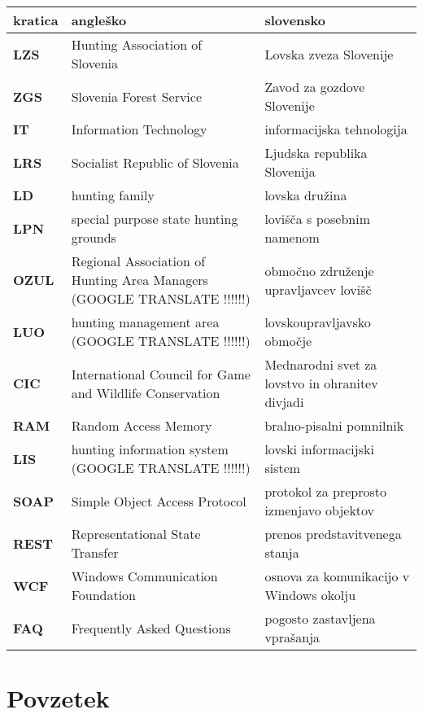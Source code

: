 \documentclass[a4paper,12pt,openright]{book}
\newcommand{\clearemptydoublepage}{\newpage{\pagestyle{empty}\cleardoublepage}}
\begin{document}
\noindent\begin{tabular}{p{}|p{}|p{}}    %
  {\bf kratica} & {\bf angleško}                              & {\bf slovensko} \\ \hline
  {\bf LZS}   & Hunting Association of Slovenia & Lovska zveza Slovenije \\
  {\bf ZGS}   & Slovenia Forest Service & Zavod za gozdove Slovenije \\
  {\bf IT}    & Information Technology & informacijska tehnologija \\
  {\bf LRS}   & Socialist Republic of Slovenia & Ljudska republika Slovenija \\
  {\bf LD}    & hunting family & lovska družina \\
  {\bf LPN}   & special purpose state hunting grounds & lovišča s posebnim namenom \\
  {\bf OZUL}  & Regional Association of Hunting Area Managers (GOOGLE TRANSLATE !!!!!!)& območno združenje upravljavcev lovišč \\
  {\bf LUO}   & hunting management area (GOOGLE TRANSLATE !!!!!!) & lovskoupravljavsko območje \\
  {\bf CIC}   & International Council for Game and Wildlife Conservation & Mednarodni svet za lovstvo in ohranitev divjadi \\
  {\bf RAM}   & Random Access Memory & bralno-pisalni pomnilnik \\
  {\bf LIS}   & hunting information system (GOOGLE TRANSLATE !!!!!!) & lovski informacijski sistem \\
  {\bf SOAP}  & Simple Object Access Protocol & protokol za preprosto izmenjavo objektov \\
  {\bf REST}  & Representational State Transfer & prenos predstavitvenega stanja \\
  {\bf WCF}   & Windows Communication Foundation & osnova za komunikacijo v Windows okolju \\
  {\bf FAQ}   & Frequently Asked Questions  & pogosto zastavljena vprašanja \\
\end{tabular}



\clearemptydoublepage

\chapter*{Povzetek}
\end{document}
